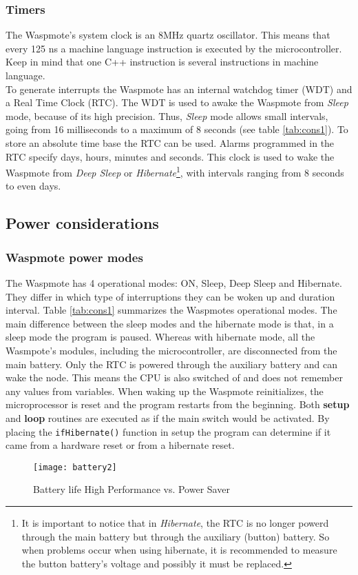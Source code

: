 \subsubsection{Timers}
The Waspmote's system clock is an 8MHz quartz oscillator. This means that every 125 ns a machine language instruction is executed by the microcontroller. Keep in mind that one C++ instruction is several instructions in machine language.\\
To generate interrupts the Waspmote has an internal watchdog timer (WDT) and a Real Time Clock (RTC). The WDT is used to awake the Waspmote from \textit{Sleep} mode, because of its high precision. Thus, \textit{Sleep} mode allows small intervals, going from 16 milliseconds to a maximum of 8 seconds (see table \ref{tab:cons1}). To store an absolute time base the RTC can be used. Alarms programmed in the RTC specify days, hours, minutes and seconds. This clock is used to wake the Waspmote from \textit{Deep Sleep} or \textit{Hibernate}\footnote{It is important to notice that in \textit{Hibernate}, the RTC is no longer powerd through the main battery but through the auxiliary (button) battery. So when problems occur when using hibernate, it is recommended to measure the button battery's voltage and possibly it must be replaced.}, with intervals ranging from 8 seconds to even days.
\subsection{Power considerations}
\label{pow}
\subsubsection{Waspmote power modes}
\label{dynPow}
The Waspmote has 4 operational modes: ON, Sleep, Deep Sleep and Hibernate. They differ in which type of interruptions they can be woken up and duration interval. Table \ref{tab:cons1} summarizes the Waspmotes operational modes. The main difference between the sleep modes and the hibernate mode is that, in a sleep mode the program is paused. Whereas with hibernate mode, all the Wasmpote's modules, including the microcontroller, are disconnected from the main battery. Only the RTC is powered through the auxiliary battery and can wake the node. This means the CPU is also switched of and does not remember any values from variables. When waking up the Waspmote reinitializes, the microprocessor is reset and the program restarts from the beginning. Both \textbf{setup} and \textbf{loop} routines are executed as if the main switch would be activated. By placing the \verb+ifHibernate()+ function in setup the program can determine if it came from a hardware reset or from a hibernate reset.\\
\begin{figure*}[!ht]
\centering
\texttt{[image: battery2]}
\caption{Battery life High Performance vs. Power Saver}
\label{fig:batCalcPSS}
\end{figure*}

